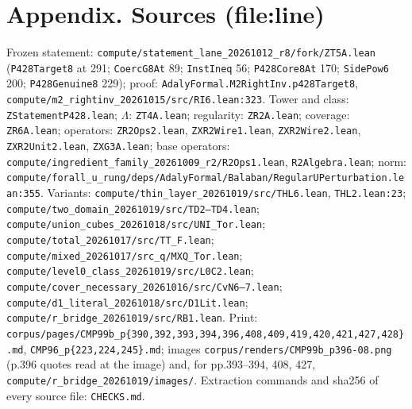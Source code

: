 \documentclass[10pt,a4paper]{article}
\begin{document}
\section*{Appendix. Sources (file:line)}
\fontsize{8.6}{10.2}\selectfont
Frozen statement: \texttt{compute/statement\_lane\_20261012\_r8/fork/ZT5A.lean} (\texttt{P428Target8} at 291; \texttt{CoercG8At} 89; \texttt{InstIneq} 56; \texttt{P428Core8At} 170; \texttt{SidePow6} 200; \texttt{P428Genuine8} 229); proof: \texttt{AdalyFormal.M2RightInv.p428Target8}, \texttt{compute/m2\_rightinv\_20261015/src/RI6.lean:323}. Tower and class: \texttt{ZStatementP428.lean}; $\Lambda$: \texttt{ZT4A.lean}; regularity: \texttt{ZR2A.lean}; coverage: \texttt{ZR6A.lean}; operators: \texttt{ZR2Ops2.lean}, \texttt{ZXR2Wire1.lean}, \texttt{ZXR2Wire2.lean}, \texttt{ZXR2Unit2.lean}, \texttt{ZXG3A.lean}; base operators: \texttt{compute/ingredient\_family\_20261009\_r2/R2Ops1.lean}, \texttt{R2Algebra.lean}; norm: \texttt{compute/forall\_u\_rung/deps/AdalyFormal/Balaban/RegularUPerturbation.lean:355}. Variants: \texttt{compute/thin\_layer\_20261019/src/THL6.lean}, \texttt{THL2.lean:23}; \texttt{compute/two\_domain\_20261019/src/TD2--TD4.lean}; \texttt{compute/union\_cubes\_20261018/src/UNI\_Tor.lean}; \texttt{compute/total\_20261017/src/TT\_F.lean}; \texttt{compute/mixed\_20261017/src\_q/MXQ\_Tor.lean}; \texttt{compute/level0\_class\_20261019/src/L0C2.lean}; \texttt{compute/cover\_necessary\_20261016/src/CvN6--7.lean}; \texttt{compute/d1\_literal\_20261018/src/D1Lit.lean}; \texttt{compute/r\_bridge\_20261019/src/RB1.lean}. Print: \texttt{corpus/pages/CMP99b\_p\{390,392,393,394,396,408,409,419,420,421,427,428\}.md}, \texttt{CMP96\_p\{223,224,245\}.md}; images \texttt{corpus/renders/CMP99b\_p396-08.png} (p.396 quotes read at the image) and, for pp.393--394, 408, 427, \texttt{compute/r\_bridge\_20261019/images/}. Extraction commands and sha256 of every source file: \texttt{CHECKS.md}.
\end{document}
